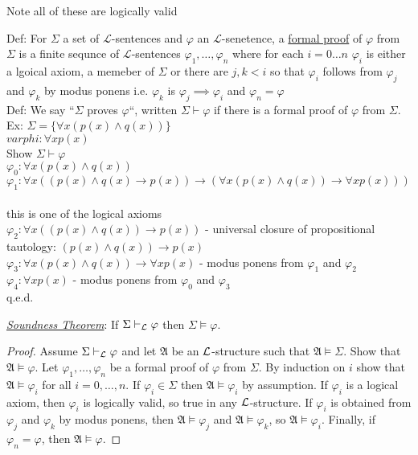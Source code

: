 \documentclass[11pt]{amsart}
\begin{document}
    Note all of these are logically valid

    Def: For $\Sigma$ a set of $\mathcal{L}$-sentences and $\varphi$ an $\mathcal{L}$-senetence, a \underline{formal proof} of $\varphi$ from $\Sigma$ is a finite sequnce of $\mathcal{L}$-sentences $\varphi_1, \dots, \varphi_n$
    where for each $i = 0 \dots n$ $\varphi_i$ is either a lgoical axiom, a memeber of $\Sigma$ or there are $j,k < i$ so that $\varphi_i$ follows from $\varphi_j$ and $\varphi_k$ by modus ponens i.e. $\varphi_k$ is $\varphi_j \implies \varphi_i$ and $\varphi_n = \varphi$
    \\
    Def: We say ``$\Sigma$ proves $\varphi$``, written $\Sigma \vdash \varphi$ if there is a formal proof of $\varphi$ from $\Sigma$.
    \\
    \newcommand{\set}[1]{\{#1\}}
    Ex: $\Sigma = \set{\forall x (p(x) \wedge q(x))}$ \\
    $varphi : \forall x p(x)$ \\
    Show $\Sigma \vdash \varphi$ \\
    $\varphi_0: \forall x (p(x) \wedge q(x))$ \\
    $\varphi_1: \forall x ((p(x) \wedge q(x) \rightarrow p(x)) \rightarrow (\forall x (p(x) \wedge q(x)) \rightarrow \forall x p(x)))$ \\
    \\ this is one of the logical axioms \\
    $\varphi_2: \forall x ((p(x) \wedge q(x)) \rightarrow p(x))$ - universal closure of propositional tautology: $(p(x) \wedge q(x)) \rightarrow p(x)$
    \\ $\varphi_3: \forall x (p(x) \wedge q(x)) \rightarrow \forall x p(x)$ - modus ponens from $\varphi_1$ and $\varphi_2$ \\
    $\varphi_4: \forall x p(x)$ - modus ponens from $\varphi_0$ and $\varphi_3$ \\ q.e.d.

    \emph{\underline{Soundness Theorem}}: If $\Sigma \vdash_{\mathcal{L}} \varphi$ then $\Sigma \models \varphi$.

    \begin{proof}
        Assume $\Sigma \vdash_{\mathcal{L}} \varphi$ and let $\mathfrak{A}$ be an $\mathcal{L}$-structure such that $\mathfrak{A} \models \Sigma$.
        Show that $\mathfrak{A} \models \varphi$.
        Let $\varphi_1, \dots, \varphi_n$ be a formal proof of $\varphi$ from $\Sigma$.
        By induction on $i$ show that $\mathfrak{A} \models \varphi_i$ for all $i = 0, \dots, n$.
        If $\varphi_i \in \Sigma$ then $\mathfrak{A} \models \varphi_i$ by assumption.
        If $\varphi_i$ is a logical axiom, then $\varphi_i$ is logically valid, so true in any $\mathcal{L}$-structure.
        If $\varphi_i$ is obtained from $\varphi_j$ and $\varphi_k$ by modus ponens, then $\mathfrak{A} \models \varphi_j$ and $\mathfrak{A} \models \varphi_k$, so $\mathfrak{A} \models \varphi_i$.
        Finally, if $\varphi_n = \varphi$, then $\mathfrak{A} \models \varphi$.
    \end{proof}
\end{document}
